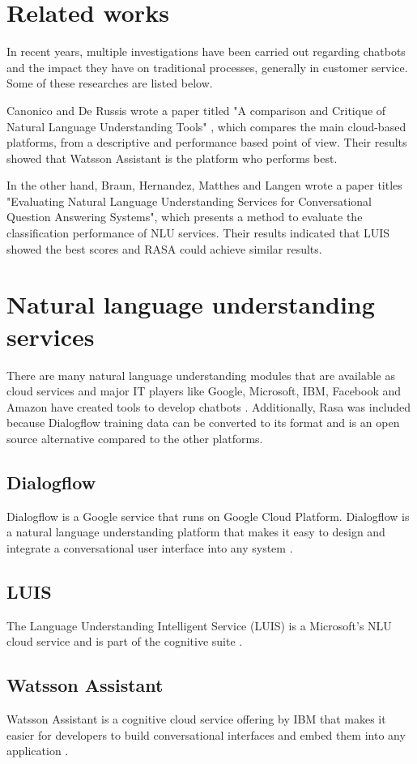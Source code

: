 \documentclass[conference]{IEEEtran}
\begin{document}
\section{Related works}
In recent years, multiple investigations have been carried out regarding chatbots and the impact they have on traditional processes, generally in customer service. Some of these researches are listed below.

Canonico and De Russis wrote a paper titled "A comparison and Critique of Natural Language Understanding Tools" \cite{Canonico2018}, which compares the main cloud-based platforms, from a descriptive and performance based point of view. Their results showed that Watsson Assistant is the platform who performs best.

In the other hand, Braun, Hernandez, Matthes and Langen wrote a paper titles "Evaluating Natural Language Understanding Services for Conversational Question Answering Systems", which presents a method to evaluate the classification performance of NLU services. Their results indicated that LUIS showed the best scores and RASA could achieve similar results.

\section{Natural language understanding services} \label{sec:nluServices}
There are many natural language understanding modules that are available as cloud services and major IT players like Google, Microsoft, IBM, Facebook and Amazon have created tools to develop chatbots \cite{hall2017hands}. Additionally, Rasa was included because Dialogflow training data can be converted to its format and is an open source alternative compared to  the other platforms.
\subsection{Dialogflow}
Dialogflow is a Google service that runs on Google Cloud Platform. Dialogflow is a natural language understanding platform that makes it easy to design and integrate a conversational user interface into any system \cite{dialogflow2020}.
\subsection{LUIS}
The Language Understanding Intelligent Service (LUIS) is a Microsoft's NLU cloud service and is part of the cognitive suite \cite{pathak2018iot}.
\subsection{Watsson Assistant}
Watsson Assistant is a cognitive cloud service offering by IBM that makes it easier for developers to build conversational interfaces and embed them into any application \cite{sabharwal2019developing}.
\end{document}

